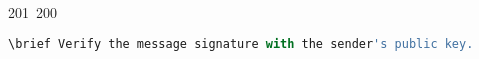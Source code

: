 201~200~\documentclass{article}
\begin{document}
\begin{lstlisting}[language=Python, caption=Signing and Verifying Messages]
	                                                                                                                                                                                                                                                                                                	                                                                                                                                        	    	                                                                                                	                                                                                                                                                                                                                                                                                                                                	                                                                        	                                                                        	                                                                                                                                        	                                                                                                                                                                                                                        	                                                                                                                            	                                \brief Verify the message signature with the sender's public key.
	                                                                                                                                                                                                                                                                                                	                                                                                                                                        	    	                                                                                                	                                                                                                                                                                                                                                                                                                                                	                                                                        	                                                                        	                                                                                                                                        	                                                                                                                                                                                                                        	                                                                                                                            	                                    \param public_key The public key used to verify the signature.

\end{lstlisting}
\end{document}
